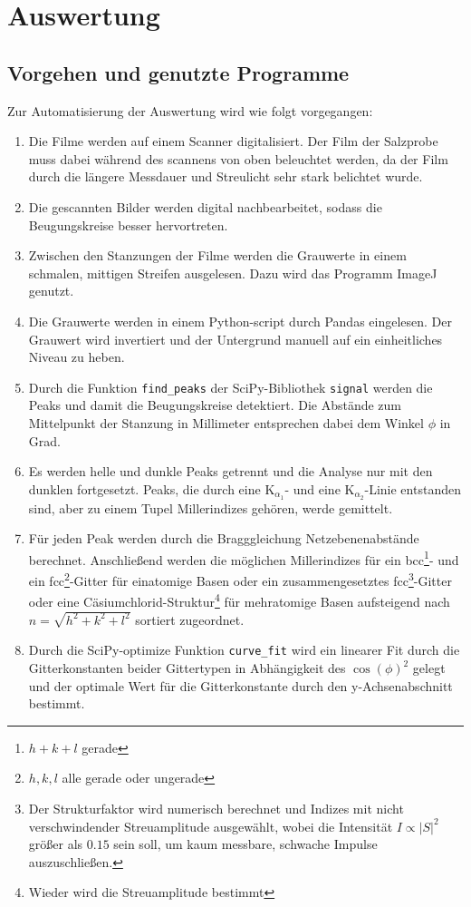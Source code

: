 \section{Auswertung}
\subsection{Vorgehen und genutzte Programme}
Zur Automatisierung der Auswertung wird wie folgt vorgegangen:
\begin{enumerate}
  \item Die Filme werden auf einem Scanner digitalisiert.
  Der Film der Salzprobe muss dabei während des scannens von oben beleuchtet werden,
  da der Film durch die längere Messdauer und Streulicht sehr stark belichtet
  wurde.
  \item Die gescannten Bilder werden digital nachbearbeitet, sodass die
  Beugungskreise besser hervortreten.
  \item Zwischen den Stanzungen der Filme werden die Grauwerte in einem schmalen,
  mittigen Streifen ausgelesen.
  Dazu wird das Programm ImageJ\cite{Schneider2012} genutzt.
  \item Die Grauwerte werden in einem Python\cite{python}-script
  durch Pandas\cite{mckinney-proc-scipy-2010} eingelesen.
  Der Grauwert wird invertiert und der Untergrund manuell auf ein
  einheitliches Niveau zu heben.
  \item Durch die Funktion \texttt{find\_peaks} der SciPy\cite{scipy}-Bibliothek
  \texttt{signal} werden die Peaks und damit die Beugungskreise detektiert.
  Die Abstände zum Mittelpunkt der Stanzung in Millimeter entsprechen dabei
  dem Winkel $\phi$ in Grad.
  \item Es werden helle und dunkle Peaks getrennt und die Analyse nur mit den dunklen
  fortgesetzt.
  Peaks, die durch eine K$_{\alpha_{1}}$- und eine K$_{\alpha_{2}}$-Linie
  entstanden sind, aber zu einem Tupel Millerindizes gehören, werde gemittelt.
  \item Für jeden Peak werden durch die Bragggleichung Netzebenenabstände
  berechnet. Anschließend werden die möglichen Millerindizes für ein bcc\footnote{$h+k+l$ gerade}-
  und ein fcc\footnote{$h, k, l$ alle gerade oder ungerade}-Gitter für einatomige
  Basen oder ein zusammengesetztes fcc\footnote{Der Strukturfaktor wird numerisch berechnet
  und Indizes mit nicht verschwindender Streuamplitude ausgewählt, wobei die Intensität $I \propto |S|^{2}$ größer
  als $0.15$ sein soll, um kaum messbare, schwache Impulse auszuschließen.}-Gitter oder eine Cäsiumchlorid-Struktur\footnote{
  Wieder wird die Streuamplitude bestimmt
  }
  für mehratomige Basen aufsteigend nach $n=\sqrt{h^{2}+k^{2}+l^{2}}$ sortiert zugeordnet.
  \item Durch die SciPy-optimize Funktion \texttt{curve\_fit} wird ein linearer
  Fit durch die Gitterkonstanten beider Gittertypen in Abhängigkeit
  des $\cos{(\phi)}^{2}$ gelegt und der optimale Wert für die Gitterkonstante
  durch den y-Achsenabschnitt bestimmt.
\end{enumerate}

